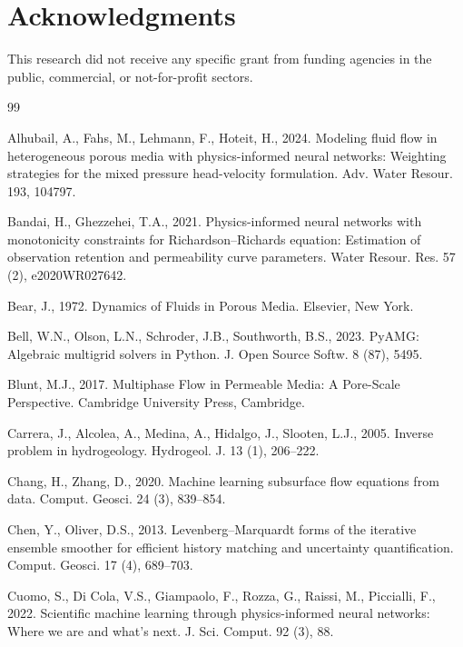 \documentclass[preprint,12pt,authoryear]{elsarticle}
\begin{document}
\section*{Acknowledgments}
This research did not receive any specific grant from funding agencies in the public, commercial, or not-for-profit sectors.

\begin{thebibliography}{99}

Alhubail, A., Fahs, M., Lehmann, F., Hoteit, H., 2024. Modeling fluid flow in heterogeneous porous media with physics-informed neural networks: Weighting strategies for the mixed pressure head-velocity formulation. Adv. Water Resour. 193, 104797.

Bandai, H., Ghezzehei, T.A., 2021. Physics-informed neural networks with monotonicity constraints for Richardson--Richards equation: Estimation of observation retention and permeability curve parameters. Water Resour. Res. 57 (2), e2020WR027642.

Bear, J., 1972. Dynamics of Fluids in Porous Media. Elsevier, New York.

Bell, W.N., Olson, L.N., Schroder, J.B., Southworth, B.S., 2023. PyAMG: Algebraic multigrid solvers in Python. J. Open Source Softw. 8 (87), 5495.

Blunt, M.J., 2017. Multiphase Flow in Permeable Media: A Pore-Scale Perspective. Cambridge University Press, Cambridge.

Carrera, J., Alcolea, A., Medina, A., Hidalgo, J., Slooten, L.J., 2005. Inverse problem in hydrogeology. Hydrogeol. J. 13 (1), 206--222.

Chang, H., Zhang, D., 2020. Machine learning subsurface flow equations from data. Comput. Geosci. 24 (3), 839--854.

Chen, Y., Oliver, D.S., 2013. Levenberg--Marquardt forms of the iterative ensemble smoother for efficient history matching and uncertainty quantification. Comput. Geosci. 17 (4), 689--703.

Cuomo, S., Di Cola, V.S., Giampaolo, F., Rozza, G., Raissi, M., Piccialli, F., 2022. Scientific machine learning through physics-informed neural networks: Where we are and what's next. J. Sci. Comput. 92 (3), 88.


\end{thebibliography}
\end{document}
